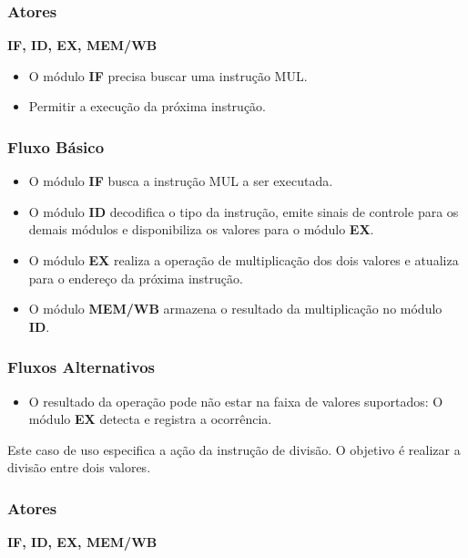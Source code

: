 \subsubsection*{Atores}
\textbf{IF, ID, EX, MEM/WB}

\preconditions 
\begin{itemize}
 \item O módulo \textbf{IF} precisa buscar uma instrução MUL.
\end{itemize}

\postconditions
\begin{itemize}
  \item Permitir a execução da próxima instrução.
\end{itemize}

\subsubsection*{Fluxo Básico}
\begin{itemize}
\item O módulo \textbf{IF} busca a instrução MUL a ser executada.
\item O módulo \textbf{ID} decodifica o tipo da instrução, emite sinais de controle para os demais módulos e disponibiliza os valores para o módulo \textbf{EX}.
\item O módulo \textbf{EX} realiza a operação de multiplicação dos dois valores e atualiza para o endereço da próxima instrução.
\item O módulo \textbf{MEM/WB} armazena o resultado da multiplicação no módulo \textbf{ID}.
\end{itemize}

\subsubsection*{Fluxos Alternativos}
\begin{itemize}
\item O resultado da operação pode não estar na faixa de valores suportados:
\subitem O módulo \textbf{EX} detecta e registra a ocorrência.
\end{itemize}


Este caso de uso especifica a ação da instrução de divisão. O objetivo é realizar a divisão entre dois valores.
 
\subsubsection*{Atores}
\textbf{IF, ID, EX, MEM/WB}

